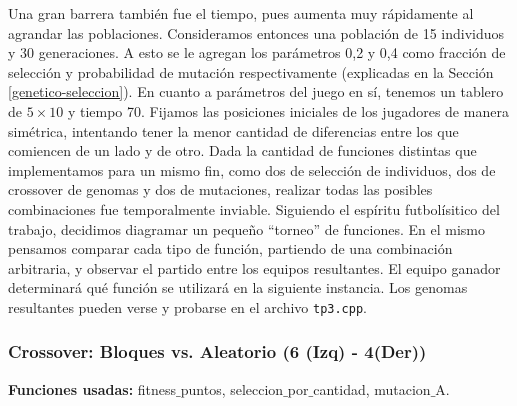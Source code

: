 Una gran barrera también fue el tiempo, pues aumenta muy rápidamente al agrandar las poblaciones.
Consideramos entonces una población de 15 individuos y 30 generaciones. A esto se le agregan los parámetros 0,2 y 0,4 como fracción de selección y probabilidad de mutación respectivamente (explicadas en la Sección \ref{genetico-seleccion}).
En cuanto a parámetros del juego en sí, tenemos un tablero de $5\times10$ y tiempo 70.
Fijamos las posiciones iniciales de los jugadores de manera simétrica, intentando tener la menor cantidad de diferencias entre los que comiencen de un lado y de otro.
Dada la cantidad de funciones distintas que implementamos para un mismo fin, como dos de selección de individuos, dos de crossover de genomas y dos de mutaciones, realizar todas las posibles combinaciones fue temporalmente inviable. Siguiendo el espíritu futbolísitico del trabajo, decidimos diagramar un pequeño ``torneo'' de funciones. En el mismo pensamos comparar cada tipo de función, partiendo de una combinación arbitraria, y observar el partido entre los equipos resultantes. El equipo ganador determinará qué función se utilizará en la siguiente instancia. Los genomas resultantes pueden verse y probarse en el archivo \texttt{tp3.cpp}.




\subsubsection*{Crossover: Bloques vs. Aleatorio (6 (Izq) - 4(Der))}

\textbf{Funciones usadas: } fitness$\_$puntos, seleccion$\_$por$\_$cantidad, mutacion$\_$A.





